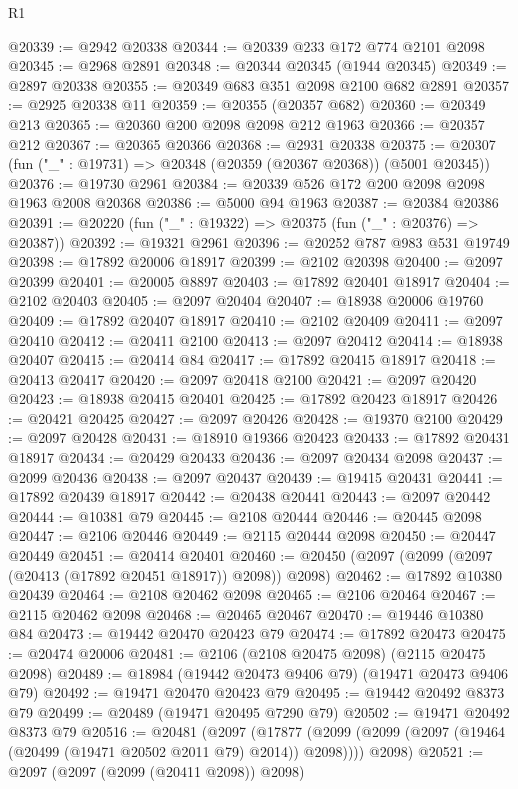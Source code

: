 \begin{lexlean}{R1}
\begin{coremodule}
@20339 := @2942 @20338
@20344 := @20339 @233 @172 @774 @2101 @2098
@20345 := @2968 @2891
@20348 := @20344 @20345 (@1944 @20345)
@20349 := @2897 @20338
@20355 := @20349 @683 @351 @2098 @2100 @682 @2891
@20357 := @2925 @20338 @11
@20359 := @20355 (@20357 @682)
@20360 := @20349 @213
@20365 := @20360 @200 @2098 @2098 @212 @1963
@20366 := @20357 @212
@20367 := @20365 @20366
@20368 := @2931 @20338
@20375 := @20307 (fun ("_" : @19731) => @20348 (@20359 (@20367 @20368)) (@5001 @20345))
@20376 := @19730 @2961
@20384 := @20339 @526 @172 @200 @2098 @2098 @1963 @2008 @20368
@20386 := @5000 @94 @1963
@20387 := @20384 @20386
@20391 := @20220 (fun ("_" : @19322) => @20375 (fun ("_" : @20376) => @20387))
@20392 := @19321 @2961
@20396 := @20252 @787 @983 @531 @19749
@20398 := @17892 @20006 @18917
@20399 := @2102 @20398
@20400 := @2097 @20399
@20401 := @20005 @8897
@20403 := @17892 @20401 @18917
@20404 := @2102 @20403
@20405 := @2097 @20404
@20407 := @18938 @20006 @19760
@20409 := @17892 @20407 @18917
@20410 := @2102 @20409
@20411 := @2097 @20410
@20412 := @20411 @2100
@20413 := @2097 @20412
@20414 := @18938 @20407
@20415 := @20414 @84
@20417 := @17892 @20415 @18917
@20418 := @20413 @20417
@20420 := @2097 @20418 @2100
@20421 := @2097 @20420
@20423 := @18938 @20415 @20401
@20425 := @17892 @20423 @18917
@20426 := @20421 @20425
@20427 := @2097 @20426
@20428 := @19370 @2100
@20429 := @2097 @20428
@20431 := @18910 @19366 @20423
@20433 := @17892 @20431 @18917
@20434 := @20429 @20433
@20436 := @2097 @20434 @2098
@20437 := @2099 @20436
@20438 := @2097 @20437
@20439 := @19415 @20431
@20441 := @17892 @20439 @18917
@20442 := @20438 @20441
@20443 := @2097 @20442
@20444 := @10381 @79
@20445 := @2108 @20444
@20446 := @20445 @2098
@20447 := @2106 @20446
@20449 := @2115 @20444 @2098
@20450 := @20447 @20449
@20451 := @20414 @20401
@20460 := @20450 (@2097 (@2099 (@2097 (@20413 (@17892 @20451 @18917)) @2098)) @2098)
@20462 := @17892 @10380 @20439
@20464 := @2108 @20462 @2098
@20465 := @2106 @20464
@20467 := @2115 @20462 @2098
@20468 := @20465 @20467
@20470 := @19446 @10380 @84
@20473 := @19442 @20470 @20423 @79
@20474 := @17892 @20473
@20475 := @20474 @20006
@20481 := @2106 (@2108 @20475 @2098) (@2115 @20475 @2098)
@20489 := @18984 (@19442 @20473 @9406 @79) (@19471 @20473 @9406 @79)
@20492 := @19471 @20470 @20423 @79
@20495 := @19442 @20492 @8373 @79
@20499 := @20489 (@19471 @20495 @7290 @79)
@20502 := @19471 @20492 @8373 @79
@20516 := @20481
    (@2097
      (@17877 (@2099 (@2099 (@2097 (@19464 (@20499 (@19471 @20502 @2011 @79) @2014)) @2098))))
      @2098)
@20521 := @2097 (@2097 (@2099 (@20411 @2098)) @2098)

\end{coremodule}
\end{lexlean}
